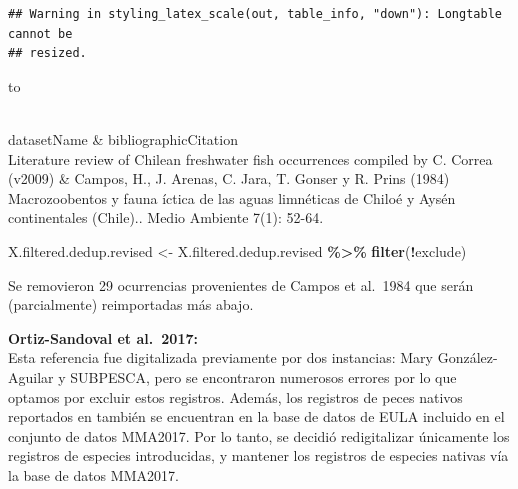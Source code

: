 \documentclass[sn-apa,pdflatex]{sn-jnl}
\newenvironment{Shaded}{\begin{snugshade}}{\end{snugshade}}
\newcommand{\AttributeTok}[1]{\textcolor[rgb]{0.13,0.29,0.53}{#1}}
\newcommand{\CommentTok}[1]{\textcolor[rgb]{0.56,0.35,0.01}{\textit{#1}}}
\newcommand{\ConstantTok}[1]{\textcolor[rgb]{0.56,0.35,0.01}{#1}}
\newcommand{\FunctionTok}[1]{\textcolor[rgb]{0.13,0.29,0.53}{\textbf{#1}}}
\newcommand{\NormalTok}[1]{#1}
\newcommand{\OtherTok}[1]{\textcolor[rgb]{0.56,0.35,0.01}{#1}}
\newcommand{\SpecialCharTok}[1]{\textcolor[rgb]{0.81,0.36,0.00}{\textbf{#1}}}
\newcommand{\StringTok}[1]{\textcolor[rgb]{0.31,0.60,0.02}{#1}}
\begin{document}
\begin{verbatim}
## Warning in styling_latex_scale(out, table_info, "down"): Longtable cannot be
## resized.
\end{verbatim}

\begingroup\fontsize{8}{10}\selectfont

\begin{longtabu} to 
\caption{\label{tab:unnamed-chunk-231}La siguientes instancias de Campos et al. (1984) fueron sustituidas en este adendum.}\\
\toprule
datasetName & bibliographicCitation\\
\midrule
Literature review of Chilean freshwater fish occurrences compiled by C. Correa (v2009) & Campos, H., J. Arenas, C. Jara, T. Gonser y R. Prins (1984) Macrozoobentos y fauna íctica de las aguas limnéticas de Chiloé y Aysén continentales (Chile).. Medio Ambiente 7(1): 52-64.\\
\bottomrule
\end{longtabu}
\endgroup{}

\begin{Shaded}
\begin{Highlighting}[]
\NormalTok{X.filtered.dedup.revised }\OtherTok{\textless{}{-}}\NormalTok{ X.filtered.dedup.revised }\SpecialCharTok{\%\textgreater{}\%}
    \FunctionTok{filter}\NormalTok{(}\SpecialCharTok{!}\NormalTok{exclude)}
\end{Highlighting}
\end{Shaded}

Se removieron 29 ocurrencias provenientes de Campos et al.~1984 que
serán (parcialmente) reimportadas más abajo.

\textbf{Ortiz-Sandoval et al.~2017:}\\
Esta referencia fue digitalizada previamente por dos instancias: Mary
González-Aguilar y SUBPESCA, pero se encontraron numerosos errores por
lo que optamos por excluir estos registros. Además, los registros de
peces nativos reportados en \citet{Ortiz-Sandoval2017} también se
encuentran en la base de datos de EULA incluido en el conjunto de datos
MMA2017. Por lo tanto, se decidió redigitalizar únicamente los registros
de especies introducidas, y mantener los registros de especies nativas
vía la base de datos MMA2017.

\begin{Shaded}
\end{Shaded}
\end{document}

